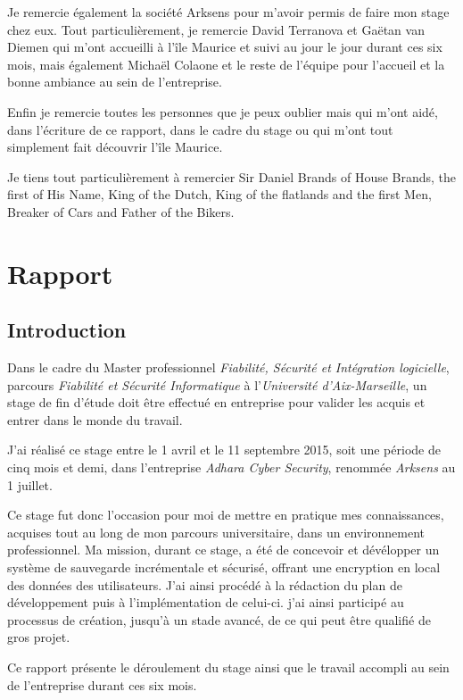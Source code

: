 \documentclass[a4paper,10pt, twoside]{report}
\begin{document}
\begin{spacing}{1.2}
Je remercie également la société Arksens pour m'avoir permis de faire mon
stage chez eux. Tout particulièrement, je remercie David Terranova et Gaëtan
van Diemen qui m'ont accueilli à l'île Maurice et suivi au jour le jour
durant ces six mois, mais également Michaël Colaone et le reste de
l'équipe pour l'accueil et la bonne ambiance au sein de l'entreprise.

Enfin je remercie toutes les personnes que je peux oublier mais qui m'ont
aidé, dans l'écriture de ce rapport, dans le cadre du stage ou qui m'ont
tout simplement fait découvrir l'île Maurice.

Je tiens tout particulièrement à remercier Sir Daniel Brands of House Brands,
the first of His Name, King of the Dutch, King of the flatlands and the first
Men, Breaker of Cars and Father of the Bikers.

\clearpage
\pagestyle{fancy}
\tableofcontents
\clearpage

\part{Rapport}
\thispagestyle{empty}
\chapter{Introduction}
\thispagestyle{fancy}
Dans le cadre du Master professionnel \textit{Fiabilité, Sécurité et
Intégration logicielle}, parcours \textit{Fiabilité et Sécurité
Informatique} à l'\textit{Université d'Aix-Marseille}, un stage de fin
d'étude doit être effectué en entreprise pour valider les acquis et
entrer dans le monde du travail.

J'ai réalisé ce stage entre le 1 avril et le 11 septembre 2015, soit
une période de cinq mois et demi, dans l'entreprise \textit{Adhara Cyber
Security}, renommée \textit{Arksens} au 1 juillet.

Ce stage fut donc l'occasion pour moi de mettre en pratique mes connaissances,
acquises tout au long de mon parcours universitaire, dans un environnement
professionnel. Ma mission, durant ce stage, a été de concevoir et
dévélopper un système de sauvegarde incrémentale et sécurisé, offrant
une encryption en local des données des utilisateurs. J'ai ainsi procédé
à la rédaction du plan de développement puis à l'implémentation de
celui-ci. j'ai ainsi participé au processus de création, jusqu'à un
stade avancé, de ce qui peut être qualifié de gros projet.

Ce rapport présente le déroulement du stage ainsi que le travail accompli
au sein de l'entreprise durant ces six mois.


\end{spacing}
\end{document}
